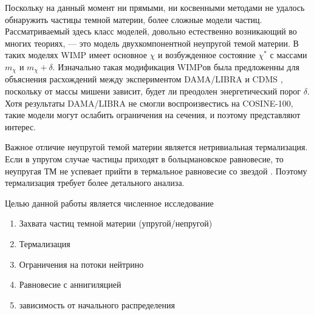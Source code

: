 Поскольку на данный момент ни прямыми, ни косвенными методами не удалось обнаружить частицы темной материи, более сложные модели частиц. Рассматриваемый здесь класс моделей, довольно естественно возникающий во многих теориях, --- это модель двухкомпонентной неупругой темой материи. В таких моделях WIMP имеет основное $\chi$ и возбужденное состояние $\chi^*$ с массами $m_{\chi}$ и $m_{\chi}+\delta$. Изначально такая модификация WIMPов была предложенны для объяснения расхождений между экспериментом DAMA/LIBRA и CDMS \cite{PhysRevD.64.043502}, поскольку от массы мишени зависит, будет ли преодолен энергетический порог $\delta$. Хотя результаты DAMA/LIBRA не смогли воспроизвестись на COSINE-100, такие модели могут ослабить ограничения на сечения, и поэтому представляют интерес.

Важное отличие неупругой темой материи является нетривиальная термализация. Если в упругом случае частицы приходят в больцмановское равновесие, то неупругая ТМ не успевает прийти в термальное равновесие со звездой \cite{Blennow_2018}. Поэтому термализация требует более детального анализа.

Целью данной работы является численное исследование
\begin{enumerate}
	\item Захвата частиц темной материи (упругой/непругой)
	\item Термализация
	\item Ограничения на потоки нейтрино
	\item Равновесие с аннигиляцией
	\item зависимость от начального распределения
\end{enumerate}

